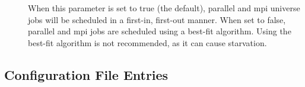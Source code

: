 \begin{description}
\item[]
  \label{param:DedicatedSchedulerUseFifo}
  When this parameter is set to true (the default), parallel and mpi
  universe jobs will be scheduled in a first-in, first-out manner.
  When set to false, parallel and mpi jobs are scheduled using a
  best-fit algorithm. Using the best-fit algorithm is not recommended,
  as it can cause starvation.

\end{description}

\subsection{\label{sec:Shadow-Config-File-Entries}
Configuration File Entries}

